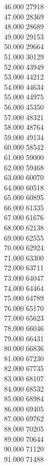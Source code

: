 { 46.000	27918 \\
 47.000	28369 \\
 48.000	28689 \\
 49.000	29153 \\
 50.000	29664 \\
 51.000	30129 \\
 52.000	43949 \\
 53.000	44212 \\
 54.000	44634 \\
 55.000	44975 \\
 56.000	45350 \\
 57.000	48321 \\
 58.000	48764 \\
 59.000	49134 \\
 60.000	58542 \\
 61.000	59000 \\
 62.000	59468 \\
 63.000	60070 \\
 64.000	60518 \\
 65.000	60895 \\
 66.000	61335 \\
 67.000	61676 \\
 68.000	62138 \\
 69.000	62555 \\
 70.000	62924 \\
 71.000	63300 \\
 72.000	63711 \\
 73.000	64047 \\
 74.000	64464 \\
 75.000	64789 \\
 76.000	65170 \\
 77.000	65623 \\
 78.000	66046 \\
 79.000	66431 \\
 80.000	66836 \\
 81.000	67230 \\
 82.000	67735 \\
 83.000	68107 \\
 84.000	68532 \\
 85.000	68984 \\
 86.000	69405 \\
 87.000	69762 \\
 88.000	70205 \\
 89.000	70644 \\
 90.000	71120 \\
 91.000	71488 \\
}
